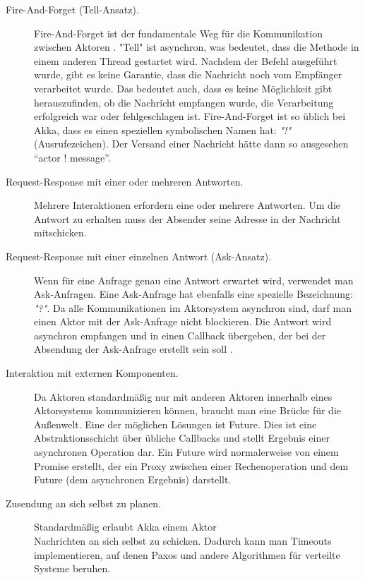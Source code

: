 \begin{description} 
	\item[Fire-And-Forget (Tell-Ansatz).] Fire-And-Forget ist der fundamentale Weg für die Kommunikation zwischen Aktoren \cite{akka}. "Tell" ist asynchron, was bedeutet, dass die Methode in einem anderen Thread gestartet wird. Nachdem der Befehl ausgeführt wurde, gibt es keine Garantie, dass die Nachricht noch vom Empfänger verarbeitet wurde. Das bedeutet auch, dass es keine Möglichkeit gibt herauszufinden, ob die Nachricht empfangen wurde, die Verarbeitung erfolgreich war oder fehlgeschlagen ist. Fire-And-Forget ist so üblich bei Akka, dass es einen speziellen symbolischen Namen hat: \textit{"!"} (Ausrufezeichen). Der Versand einer Nachricht hätte dann so ausgesehen “actor ! message”.
	
	\item[Request-Response mit einer oder mehreren Antworten.] Mehrere Interaktionen erfordern eine oder mehrere Antworten. Um die Antwort zu erhalten muss der Absender seine Adresse in der Nachricht mitschicken.
	
	\item[Request-Response mit einer einzelnen Antwort (Ask-Ansatz).] Wenn für eine Anfrage genau eine Antwort erwartet wird, verwendet man Ask-Anfragen. Eine Ask-Anfrage hat ebenfalls eine spezielle Bezeichnung: \textit{"?"}. Da alle Kommunikationen im Aktorsystem asynchron sind, darf man einen Aktor mit der Ask-Anfrage nicht blockieren. Die Antwort wird asynchron empfangen und in einen Callback übergeben, der bei der Absendung der Ask-Anfrage erstellt sein soll \cite{akka}.
	
	\item[Interaktion mit externen Komponenten.] Da Aktoren standardmäßig nur mit anderen Aktoren innerhalb eines Aktorsystems kommunizieren können, braucht man eine Brücke für die Außenwelt. Eine der möglichen Lösungen ist Future. Dies ist eine Abstraktionsschicht über übliche Callbacks und stellt Ergebnis einer asynchronen Operation dar. Ein Future wird normalerweise von einem Promise erstellt, der ein Proxy zwischen einer Rechenoperation und dem Future (dem asynchronen Ergebnis) darstellt.
	
	\item[Zusendung an sich selbst zu planen.] Standardmäßig erlaubt Akka einem Aktor \\ Nachrichten an sich selbst zu schicken. Dadurch kann man Timeouts implementieren, auf denen Paxos und andere Algorithmen für verteilte Systeme beruhen.
\end{description}

